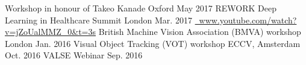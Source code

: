 \begin{cvtalks}
  \cvtalk
    {} %
    {Workshop in honour of Takeo Kanade} %
    {Oxford} %
    {May 2017} %
  \cvtalk
    {} %
    {REWORK Deep Learning in Healthcare Summit} %
    {London} %
    {Mar. 2017} %
  \cvtalkinfo
    {\href{http://www.youtube.com/watch?v=jZoUalMMZ_0\&t=3s}{\ www.youtube.com/watch?v=jZoUalMMZ\_0\&t=3s}}
    {} %
    {} %
  \cvtalk
    {} %
    {British Machine Vision Association (BMVA) workshop} %
    {London} %
    {Jan. 2016} %
  \cvtalk
    {} %
    {Visual Object Tracking (VOT) workshop} %
    {ECCV, Amsterdam} %
    {Oct. 2016} %
  \cvtalk
    {} %
    {VALSE Webinar} %
    {} %
    {Sep. 2016} %
\end{cvtalks}